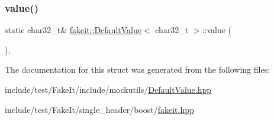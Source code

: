 \mbox{\label{structfakeit_1_1DefaultValue_3_01char32__t_01_4_ac13a220a319b9ad49e7e5e639b743f85}} 
\subsubsection{\texorpdfstring{value()}{value()}\hspace{0.1cm}{\footnotesize\ttfamily [9/9]}}
{\footnotesize\ttfamily static char32\+\_\+t\& \mbox{\hyperlink{structfakeit_1_1DefaultValue}{fakeit\+::\+Default\+Value}}$<$ char32\+\_\+t $>$\+::value (\begin{DoxyParamCaption}{ }\end{DoxyParamCaption})\hspace{0.3cm}{\ttfamily [inline]}, {\ttfamily [static]}}



The documentation for this struct was generated from the following files\+:\begin{DoxyCompactItemize}
\item 
include/test/\+Fake\+It/include/mockutils/\mbox{\hyperlink{DefaultValue_8hpp}{Default\+Value.\+hpp}}\item 
include/test/\+Fake\+It/single\+\_\+header/boost/\mbox{\hyperlink{single__header_2boost_2fakeit_8hpp}{fakeit.\+hpp}}\end{DoxyCompactItemize}
